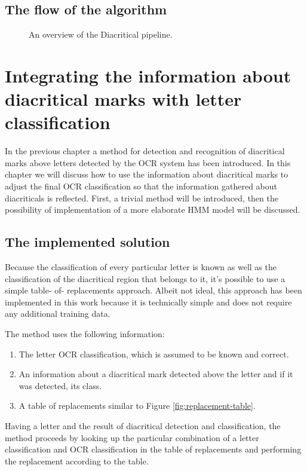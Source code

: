 \documentclass[12pt,a4paper]{report}
\begin{document}
\section{The flow of the algorithm}
\begin{figure}[htbp]
    \centering
    \caption{An overview of the Diacritical pipeline.}
    \label{fig:diacritic-flow}
\end{figure}

\chapter{Integrating the information about diacritical marks with letter classification}
In the previous chapter a method for detection and recognition of diacritical marks above letters detected by the OCR system has been introduced. In this chapter we will discuss how to use the information about diacritical marks to adjust the final OCR classification so that the information gathered about diacriticals is reflected. First, a trivial method will be introduced, then the possibility of implementation of a more elaborate HMM model will be discussed.

\section{The implemented solution}
Because the classification of every particular letter is known as well as the classification of the diacritical region that belongs to it, it's possible to use a simple table- of- replacements approach. Albeit not ideal, this approach has been implemented in this work because it is technically simple and does not require any additional training data.

The method uses the following information:
\begin{enumerate}
    \item The letter OCR classification, which is assumed to be known and correct.
    \item An information about a diacritical mark detected above the letter and if it was detected, its class.
    \item A table of replacements similar to Figure \ref{fig:replacement-table}.
\end{enumerate}

Having a letter and the result of diacritical detection and classification, the method proceeds by looking up the particular combination of a letter classification and OCR classification in the table of replacements and performing the replacement according to the table.
\end{document}
